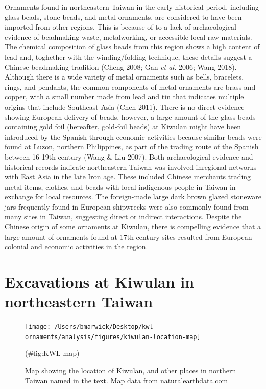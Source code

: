 \documentclass[]{article}
\begin{document}
Ornaments found in northeastern Taiwan in the early historical period,
including glass beads, stone beads, and metal ornaments, are considered
to have been imported from other regions. This is because of to a lack
of archaeological evidence of beadmaking waste, metalworking, or
accessible local raw materials. The chemical composition of glass beads
from this region shows a high content of lead and, toghether with the
winding/folding technique, these details suggest a Chinese beadmaking
tradition (Cheng 2008; Gan \emph{et al.} 2006; Wang 2018). Although
there is a wide variety of metal ornaments such as bells, bracelets,
rings, and pendants, the common components of metal ornaments are brass
and copper, with a small number made from lead and tin that indicates
multiple origins that include Southeast Asia (Chen 2011). There is no
direct evidence showing European delivery of beads, however, a large
amount of the glass beads containing gold foil (hereafter, gold-foil
beads) at Kiwulan might have been introduced by the Spanish through
economic activities because similar beads were found at Luzon, northern
Philippines, as part of the trading route of the Spanish between 16-19th
century (Wang \& Liu 2007). Both archaeological evidence and historical
records indicate northeastern Taiwan was involved inregional networks
with East Asia in the late Iron age. These included Chinese merchants
trading metal items, clothes, and beads with local indigenous people in
Taiwan in exchange for local resources. The foreign-made large dark
brown glazed stoneware jars frequently found in European shipwrecks were
also commonly found from many sites in Taiwan, suggesting direct or
indirect interactions. Despite the Chinese origin of some ornaments at
Kiwulan, there is compelling evidence that a large amount of ornaments
found at 17th century sites resulted from European colonial and economic
activities in the region.

\hypertarget{excavations-at-kiwulan-in-northeastern-taiwan}{%
\section{Excavations at Kiwulan in northeastern
Taiwan}\label{excavations-at-kiwulan-in-northeastern-taiwan}}

\begin{figure}
\texttt{[image: /Users/bmarwick/Desktop/kwl-ornaments/analysis/figures/kiwulan-location-map]} \caption{Map showing the location of Kiwulan, and other places in northern Taiwan named in the text. Map data from naturalearthdata.com}(\#fig:KWL-map)
\end{figure}
\end{document}
